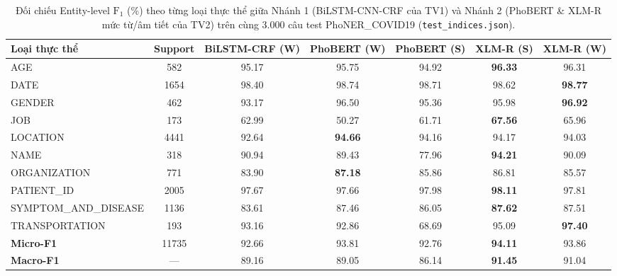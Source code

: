 \begin{table}[t]
\centering
\small
\begin{tabular}{lcccccc}
\hline
\textbf{Loại thực thể} & \textbf{Support} & \textbf{BiLSTM-CRF (W)} & \textbf{PhoBERT (W)} & \textbf{PhoBERT (S)} & \textbf{XLM-R (S)} & \textbf{XLM-R (W)} \\
\hline
AGE & 582 & 95.17 & 95.75 & 94.92 & \textbf{96.33} & 96.31 \\
DATE & 1654 & 98.40 & 98.74 & 98.71 & 98.62 & \textbf{98.77} \\
GENDER & 462 & 93.17 & 96.50 & 95.36 & 95.98 & \textbf{96.92} \\
JOB & 173 & 62.99 & 50.27 & 61.71 & \textbf{67.56} & 65.96 \\
LOCATION & 4441 & 92.64 & \textbf{94.66} & 94.16 & 94.17 & 94.03 \\
NAME & 318 & 90.94 & 89.43 & 77.96 & \textbf{94.21} & 90.09 \\
ORGANIZATION & 771 & 83.90 & \textbf{87.18} & 85.86 & 86.81 & 85.57 \\
PATIENT\_ID & 2005 & 97.67 & 97.66 & 97.98 & \textbf{98.11} & 97.81 \\
SYMPTOM\_AND\_DISEASE & 1136 & 83.61 & 87.46 & 86.05 & \textbf{87.62} & 87.51 \\
TRANSPORTATION & 193 & 93.16 & 92.86 & 68.69 & 95.09 & \textbf{97.40} \\
\hline
\textbf{Micro-F1} & 11735 & 92.66 & 93.81 & 92.76 & \textbf{94.11} & 93.86 \\
\textbf{Macro-F1} & --- & 89.16 & 89.05 & 86.14 & \textbf{91.45} & 91.04 \\
\hline
\end{tabular}
\caption{Đối chiếu Entity-level $\text{F}_1$ (\%) theo từng loại thực thể giữa Nhánh 1 (BiLSTM-CNN-CRF của TV1) và Nhánh 2 (PhoBERT \& XLM-R mức từ/âm tiết của TV2) trên cùng 3.000 câu test PhoNER\_COVID19 (\texttt{test\_indices.json}).}
\label{tab:cross-model-phoner}
\end{table}
